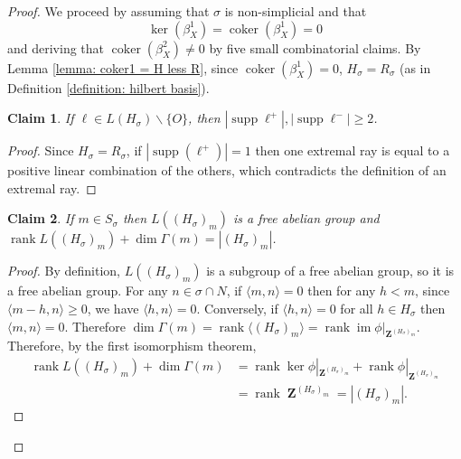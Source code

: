 \documentclass[10pt,a4paper]{amsart}
\newtheorem{claim}{Claim}
\DeclareMathOperator{\ZZ}{\mathbf{Z}}
\DeclareMathOperator{\coker}{coker}
\DeclareMathOperator{\ima}{im}
\DeclareMathOperator{\rank}{rank}
\DeclareMathOperator{\supp}{supp}
\begin{document}
\begin{proof}
    We proceed by assuming that $\sigma$ is non-simplicial and that \begin{equation}
        \ker(\beta^1_X)  =\coker(\beta^1_X)= 0
    \end{equation} and deriving that $\coker(\beta^2_X) \neq 0$ by five small combinatorial claims. By Lemma \ref{lemma: coker1 = H less R}, since $\coker(\beta^1_X)=0$, $H_\sigma= R_\sigma$ (as in Definition \ref{definition: hilbert basis}).

    \begin{claim} \label{claim: min support for relation}
        If $\ell \in L(H_\sigma) \backslash \{O \}$, then $|\supp \ell^+|, |\supp \ell^-| \geq 2$.
    \end{claim}
    \begin{proof}
    Since $H_\sigma= R_\sigma$, if $|\supp(\ell^+)|=1$ then one extremal ray is equal to a positive linear combination of the others, which contradicts the definition of an extremal ray.
    \end{proof}

    \begin{claim} \label{claim: dim L + dim Gamma = H}
        If $m \in S_{\sigma}$ then $L((H_\sigma)_m)$ is a free abelian group and $\rank L((H_\sigma)_m) + \dim \Gamma(m)= |(H_\sigma)_m|$.
    \end{claim}
    \begin{proof}
        By definition, $L((H_\sigma)_m)$ is a subgroup of a free abelian group, so it is a free abelian group. For any $n \in \sigma \cap N$, if $\langle m,n\rangle = 0$ then for any $h < m$, since $\langle m - h, n \rangle \geq 0$, we have $\langle h,n \rangle = 0$. Conversely, if $\langle h, n \rangle = 0$ for all $h \in H_\sigma$ then $\langle m, n \rangle = 0$. Therefore $\dim \Gamma(m) = \rank \langle (H_\sigma)_m \rangle = \rank \ima \phi|_{\ZZ^{(H_\sigma)_m}}$. Therefore, by the first isomorphism theorem,
        \begin{align}
            \rank L((H_\sigma)_m) + \dim \Gamma(m) &= \rank \ker \phi|_{\ZZ^{(H_\sigma)_m}} + \rank \phi|_{\ZZ^{(H_\sigma)_m}}\\
            &= \rank \ZZ^{(H_\sigma)_m} = |(H_\sigma)_m|.
        \end{align}
    \end{proof}


\end{proof}
\end{document}
